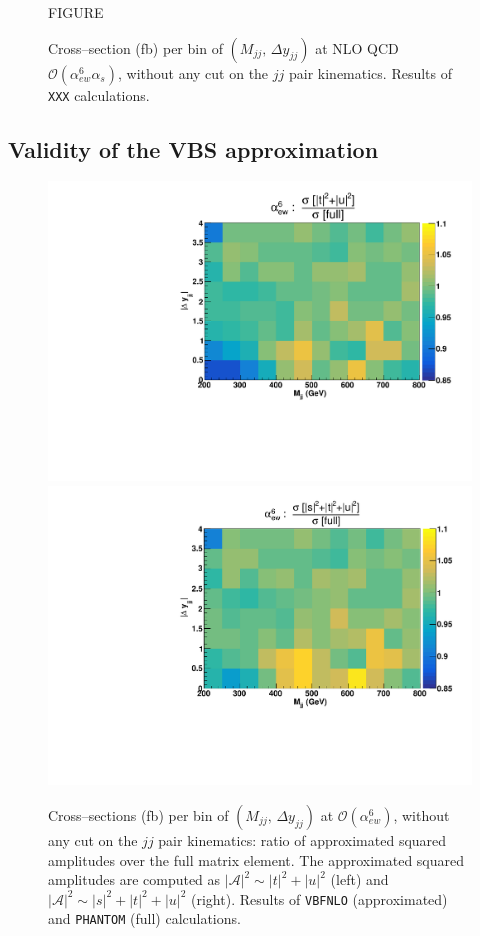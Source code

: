 \begin{figure}[hbt]
\centering
FIGURE
\caption{Cross--section (fb) per bin of $(M_{jj},\,\Delta y_{jj})$ at NLO QCD $\mathcal{O}(\alpha_{ew}^6\alpha_s)$, without any cut on the $jj$ pair kinematics. Results of \texttt{XXX} calculations.}\label{fig:mjjdyjj_2d_NLO}
\end{figure}
\newpage
\subsection{Validity of the VBS approximation}\label{subsec:VBSapprox}
\begin{figure}[hbt]
\centering
\includegraphics[scale=0.395]{figures/scanfigures/ratio_tu.pdf}
\includegraphics[scale=0.395]{figures/scanfigures/ratio_stu.pdf}
\caption{Cross--sections (fb) per bin of $(M_{jj},\,\Delta y_{jj})$ at $\mathcal{O}(\alpha_{ew}^6)$, without any cut on the $jj$ pair kinematics: ratio of approximated squared amplitudes over the full matrix element. The approximated squared amplitudes are computed as $|\mathcal{A}|^2 \sim |t|^2 + |u|^2$ (left) and $|\mathcal{A}|^2 \sim |s|^2 + |t|^2 + |u|^2$ (right). Results of \texttt{VBFNLO} (approximated) and \texttt{PHANTOM} (full) calculations.}\label{fig:ratio2d_LO}
\end{figure}

